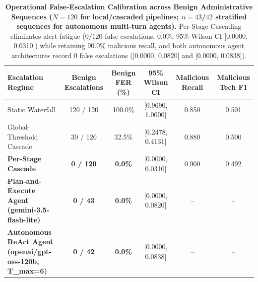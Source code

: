 \begin{table}[t]
\centering
\small
\caption{\textbf{Operational False-Escalation Calibration across Benign Administrative Sequences ($N=120$ for local/cascaded pipelines; $n=43$/$42$ stratified sequences for autonomous multi-turn agents).} Per-Stage Cascading eliminates alert fatigue ($0/120$ false escalations, $0.0\%$, 95\% Wilson CI [0.0000, 0.0310]) while retaining $90.0\%$ malicious recall, and both autonomous agent architectures record $0$ false escalations ([0.0000, 0.0820] and [0.0000, 0.0838]).}
\label{tab:benign_calibration}
\begin{tabular}{lccccc}
\toprule
\textbf{Escalation Regime} & \textbf{Benign Escalations} & \textbf{Benign FER (\%)} & \textbf{95\% Wilson CI} & \textbf{Malicious Recall} & \textbf{Malicious Tech F1} \\
\midrule
Static Waterfall & 120 / 120 & 100.0\% & [0.9690, 1.0000] & 0.850 & 0.501 \\
Global-Threshold Cascade & 39 / 120 & 32.5\% & [0.2478, 0.4131] & 0.880 & 0.500 \\
\textbf{Per-Stage Cascade} & \textbf{0 / 120} & \textbf{0.0\%} & [0.0000, 0.0310] & 0.900 & 0.492 \\
\textbf{Plan-and-Execute Agent (gemini-3.5-flash-lite)} & \textbf{0 / 43} & \textbf{0.0\%} & [0.0000, 0.0820] & -- & -- \\
\textbf{Autonomous ReAct Agent (openai/gpt-oss-120b, T\_max=6)} & \textbf{0 / 42} & \textbf{0.0\%} & [0.0000, 0.0838] & -- & -- \\
\bottomrule
\end{tabular}
\end{table}
